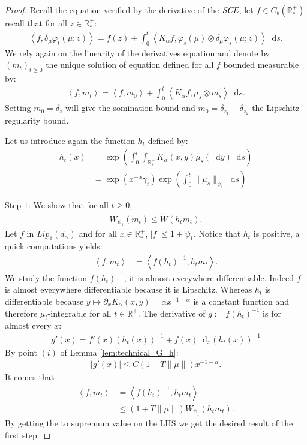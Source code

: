 \documentclass[11pt,a4paper]{article}
\newcommand{\RR}{\mathbb{R}}
\newcommand{\RRP}{\mathbb{R}^+_*}
\newcommand{\SCE}{\emph{SCE}}
\newcommand{\Proc}[1]{\left(#1\right)_{t\geq 0}}
\newcommand{\brac}[1]{\left\langle#1\right\rangle}
\newcommand{\dd}{\mathop{}\!\mathrm{d}}
\begin{document}
\begin{proof}
    Recall the equation verified by the derivative of the $\SCE$, let $f\in C_b(\RRP)$ recall that for all $z \in \RRP$:
    \begin{align*}
        \brac{f,\delta_\mu\varphi_t(\mu;z)} = f(z) + \int_0^t \brac{K_\alpha f, \varphi_s(\mu)\otimes\delta_\mu\varphi_s(\mu;z)} \dd s.
    \end{align*}
    We rely again on the linearity of the derivatives equation and denote by $\Proc{m_t}$ the unique solution of equation defined for all $f$ bounded measurable by:
    \begin{align*}
        \brac{f,m_t} = \brac{f,m_0} + \int_0^t \brac{K_\alpha f, \mu_s \otimes m_s} \dd s.
    \end{align*}
    Setting $m_0 = \delta_z$ will give the somination bound and $m_0 = \delta_{z_1} - \delta_{z_2}$ the Lipschitz regularity bound. 

    Let us introduce again the function $h_t$ defined by:
    \begin{align*}
        h_t(x) &= \exp\left(\int_0^t \int_{\RRP}K_\alpha(x,y)\mu_s(\dd y) \dd s\right)\\
        &= \exp\left(x^{-\alpha}\gamma_t\right)\exp\left( {\int_0^t\|\mu_s\|_{\psi_1}\dd s}\right)  
    \end{align*}

    Step $1$: We show that for all $t \geq 0$, 
    \begin{align*}
        W_{\psi_1}\left(m_t\right) \leq \tilde{W}\left(h_tm_t\right).
    \end{align*}
    Let $f$ in $Lip_1(d_\alpha)$ and for all $x \in \RRP$, $|f| \leq 1 + \psi_1$. Notice that $h_t$ is positive, a quick computations yields:
    \begin{align*}
        \brac{f,m_t} &= \brac{f(h_t)^{-1},h_tm_t}.
    \end{align*}
    We study the function $f (h_t)^{-1}$, it is almost everywhere differentiable. Indeed $f$ is almost everywhere differentiable because it is Lipschitz. Whereas $h_t$ is differentiable because $y \mapsto \partial_x K_\alpha(x,y) = \alpha x^{-1-\alpha}$ is a constant function and therefore $\mu_t$-integrable for all $t \in \RR^+$. The derivative of $g:=f (h_t)^{-1}$ is for almost every $x$:
    \begin{align*}
        g'(x) = f'(x)(h_t(x))^{-1} + f(x) \dd_x(h_t(x))^{-1}
    \end{align*}
    By point $(i)$ of Lemma \ref{lem:technical_G_h}:
    \begin{align*}
        \left| g'(x) \right| \leq C(1 + T\|\mu\|) x^{-1-\alpha}.
    \end{align*}
    It comes that 
    \begin{align*}
        \brac{f,m_t} &= \brac{f(h_t)^{-1},h_tm_t} \\
        &\leq  \left(1 + T\|\mu\| \right)W_{\psi_1}\left(h_tm_t\right).
    \end{align*}
    By getting the to supremum value on the LHS we get the desired result of the first step.


\end{proof}
\end{document}
